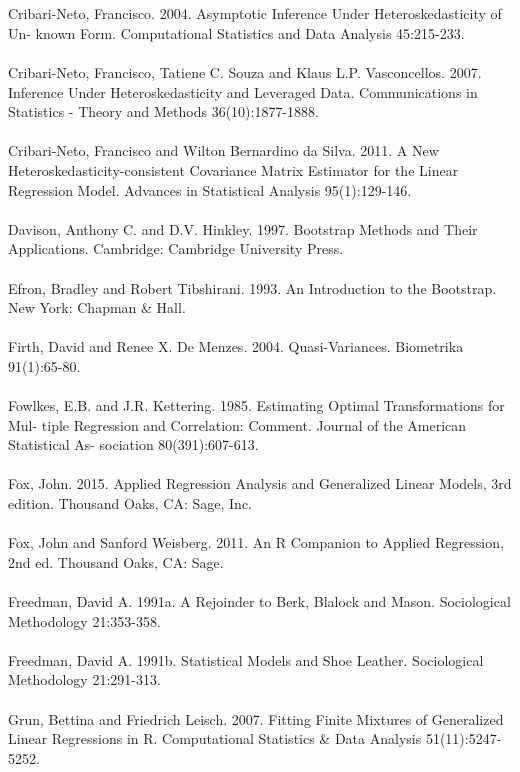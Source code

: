 \documentclass[letterpaper]{article}
\begin{document}
\\
\\
Cribari-Neto, Francisco. 2004. Asymptotic Inference Under Heteroskedasticity of Un- known Form. Computational Statistics and Data Analysis 45:215-233.
\\
\\
Cribari-Neto, Francisco, Tatiene C. Souza and Klaus L.P. Vasconcellos. 2007. Inference Under Heteroskedasticity and Leveraged Data. Communications in Statistics - Theory and Methods 36(10):1877-1888.
\\
\\
Cribari-Neto, Francisco and Wilton Bernardino da Silva. 2011. A New Heteroskedasticity-consistent Covariance Matrix Estimator for the Linear Regression Model. Advances in Statistical Analysis 95(1):129-146.
\\
\\
Davison, Anthony C. and D.V. Hinkley. 1997. Bootstrap Methods and Their Applications. Cambridge: Cambridge University Press.
\\
\\
Efron, Bradley and Robert Tibshirani. 1993. An Introduction to the Bootstrap. New York: Chapman \& Hall.
\\
\\
Firth, David and Renee X. De Menzes. 2004. Quasi-Variances. Biometrika 91(1):65-80.
\\
\\
Fowlkes, E.B. and J.R. Kettering. 1985. Estimating Optimal Transformations for Mul- tiple Regression and Correlation: Comment. Journal of the American Statistical As- sociation 80(391):607-613.
\\
\\
Fox, John. 2015. Applied Regression Analysis and Generalized Linear Models, 3rd edition. Thousand Oaks, CA: Sage, Inc.
\\
\\
Fox, John and Sanford Weisberg. 2011. An R Companion to Applied Regression, 2nd ed. Thousand Oaks, CA: Sage.
\\
\\
Freedman, David A. 1991a. A Rejoinder to Berk, Blalock and Mason. Sociological Methodology 21:353-358.
\\
\\
Freedman, David A. 1991b. Statistical Models and Shoe Leather. Sociological Methodology 21:291-313.
\\
\\
Grun, Bettina and Friedrich Leisch. 2007. Fitting Finite Mixtures of Generalized Linear Regressions in R. Computational Statistics \& Data Analysis 51(11):5247-5252.
\end{document}
